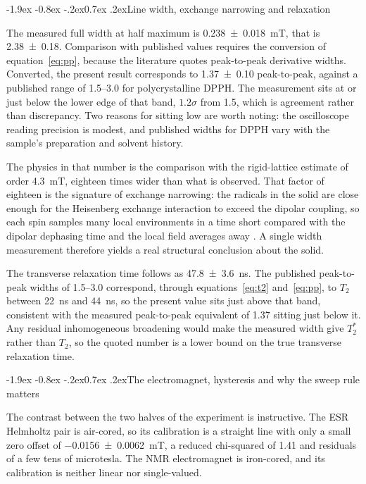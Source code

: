 \documentclass[11pt,a4paper]{article}
\makeatletter
\renewcommand\subsection{\@startsection{subsection}{2}{\z@}%
  {-1.9ex \@plus -0.8ex \@minus -.2ex}{0.7ex \@plus .2ex}{\normalfont\normalsize\bfseries}}
\makeatother
\begin{document}
\subsection{Line width, exchange narrowing and relaxation}

The measured full width at half maximum is \SI{0.238 \pm 0.018}{\milli\tesla}, that is
\SI{2.38 \pm 0.18}{\gauss}. Comparison with published values requires the conversion of
equation~\eqref{eq:pp}, because the literature quotes peak-to-peak derivative widths. Converted,
the present result corresponds to \SI{1.37 \pm 0.10}{\gauss} peak-to-peak, against a published
range of \SIrange{1.5}{3.0}{\gauss} for polycrystalline DPPH. The measurement sits at or just
below the lower edge of that band, $1.2\sigma$ from \SI{1.5}{\gauss}, which is agreement rather
than discrepancy. Two reasons for sitting low are worth noting: the oscilloscope reading precision
is modest, and published widths for DPPH vary with the sample's preparation and solvent history.

The physics in that number is the comparison with the rigid-lattice estimate of order
\SI{4.3}{\milli\tesla}, eighteen times wider than what is observed. That factor of eighteen is the
signature of exchange narrowing: the radicals in the solid are close enough for the Heisenberg
exchange interaction to exceed the dipolar coupling, so each spin samples many local environments
in a time short compared with the dipolar dephasing time and the local field averages away
\cite{anderson}. A single width measurement therefore yields a real structural conclusion about the
solid.

The transverse relaxation time follows as \SI{47.8 \pm 3.6}{\nano\second}. The published
peak-to-peak widths of \SIrange{1.5}{3.0}{\gauss} correspond, through
equations~\eqref{eq:t2} and~\eqref{eq:pp}, to $T_2$ between \SI{22}{\nano\second} and
\SI{44}{\nano\second}, so the present value sits just above that band, consistent with the
measured peak-to-peak equivalent of \SI{1.37}{\gauss} sitting just below it. Any residual
inhomogeneous broadening would make the measured width give $T_2^{*}$ rather than $T_2$, so the
quoted number is a lower bound on the true transverse relaxation time.

\subsection{The electromagnet, hysteresis and why the sweep rule matters}

The contrast between the two halves of the experiment is instructive. The ESR Helmholtz pair is
air-cored, so its calibration is a straight line with only a small zero offset of
\SI{-0.0156 \pm 0.0062}{\milli\tesla}, a reduced chi-squared of
1.41 and residuals of a few tens of microtesla. The NMR electromagnet is iron-cored, and its
calibration is neither linear nor single-valued.
\end{document}
